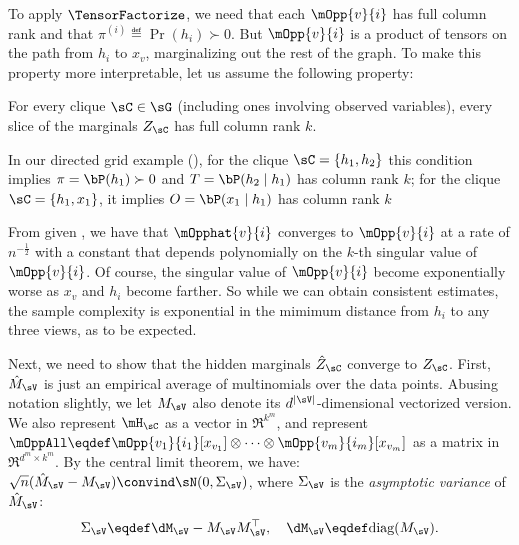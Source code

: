 To apply $\TensorFactorize$, we need that each $\mOpp{v}{i}$ has full
  column rank and that $\pi^{(i)} \eqdef \Pr(h_i) \succ 0$.
But $\mOpp{v}{i}$ is a product of
tensors on the path from $h_i$ to $x_v$, marginalizing out the rest of the graph.
To make this property more interpretable, let us assume the following property:\verify
\begin{assumption} 
\label{asm:full-rank-plus}
For every clique $\sC \in \sG$ (including ones involving observed variables),
every slice of the marginals $Z_\sC$ has full column rank $k$.
\end{assumption}
In our directed grid example (), for the clique $\sC = \{ h_1, h_2 \}$ this
  condition implies $\pi = \bP(h_1) \succ 0$ and $T = \bP(h_2 \mid h_1)$ has column rank $k$; 
for the clique $\sC = \{ h_1, x_1 \}$, it implies $O = \bP(x_1 \mid h_1)$ has column rank $k$ 


From \cite{anandkumar13tensor} given ,
we have that $\mOpphat{v}{i}$ converges to $\mOpp{v}{i}$ at a rate of $n^{-\frac12}$ with a constant that
depends polynomially on the $k$-th singular value of $\mOpp{v}{i}$.
Of course, the singular value of $\mOpp{v}{i}$ become exponentially worse as $x_v$ and $h_i$ become farther.
So while we can obtain consistent estimates, the sample complexity
is exponential in the mimimum distance from $h_i$ to any three views, as to be expected.

Next, we need to show that the hidden marginals $\hat Z_\sC$ converge to $Z_\sC$.
First, $\hat M_\sV$ is just an empirical average of multinomials over the data points.
Abusing notation slightly, we let $M_\sV$ also denote its $d^{|\sV|}$-dimensional vectorized version.
We also represent $\mH_\sC$ as
  a vector in $\Re^{k^m}$, and represent $\mOppAll \eqdef
  \mOpp{v_1}{i_1} [x_{v_1}] \otimes \cdots \otimes
  \mOpp{v_m}{i_m} [x_{v_m}]$ as a matrix in $\Re^{d^m \times
  k^m}$.
By the central limit theorem, we have:
$\sqrt{n} (\hat M_\sV - M_\sV) \convind \sN(0, \Sigma_\sV)$,
where $\Sigma_\sV$ is the \emph{asymptotic variance} of $\hat M_\sV$: 
\begin{align*}
\Sigma_\sV \eqdef \dM_\sV - M_\sV M_\sV^\top, \quad \dM_\sV \eqdef \text{diag}(M_\sV).
\end{align*}

